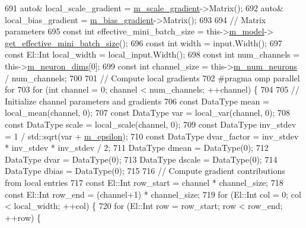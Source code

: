 \begin{DoxyCode}
691     \textcolor{keyword}{auto}& local\_scale\_gradient = \hyperlink{classlbann_1_1batch__normalization_a66364e1b0c9afb40a4c03ee1869d264c}{m\_scale\_gradient}->Matrix();
692     \textcolor{keyword}{auto}& local\_bias\_gradient = \hyperlink{classlbann_1_1batch__normalization_aa0f1e9a9f48f67544618e239167494bb}{m\_bias\_gradient}->Matrix();
693     
694     \textcolor{comment}{// Matrix parameters}
695     \textcolor{keyword}{const} \textcolor{keywordtype}{int} effective\_mini\_batch\_size = this->\hyperlink{classlbann_1_1Layer_a3d9315e99574166f2f33e37b572021d2}{m\_model}->
      \hyperlink{classlbann_1_1model_a2a9b4cfa1c8c91e4131908751f9c4a6a}{get\_effective\_mini\_batch\_size}();
696     \textcolor{keyword}{const} \textcolor{keywordtype}{int} width = input.Width();
697     \textcolor{keyword}{const} El::Int local\_width = local\_input.Width();
698     \textcolor{keyword}{const} \textcolor{keywordtype}{int} num\_channels = this->\hyperlink{classlbann_1_1Layer_abb34bb8031f57a483e2e327a5f229f48}{m\_neuron\_dims}[0];
699     \textcolor{keyword}{const} \textcolor{keywordtype}{int} channel\_size = this->\hyperlink{classlbann_1_1Layer_a6b5ebc8a7d9329d8a773ed787e7b41d8}{m\_num\_neurons} / num\_channels;
700 
701     \textcolor{comment}{// Compute local gradients}
702 \textcolor{preprocessor}{    #pragma omp parallel for}
703     \textcolor{keywordflow}{for} (\textcolor{keywordtype}{int} channel = 0; channel < num\_channels; ++channel) \{
704 
705       \textcolor{comment}{// Initialize channel parameters and gradients}
706       \textcolor{keyword}{const} DataType mean = local\_mean(channel, 0);
707       \textcolor{keyword}{const} DataType var = local\_var(channel, 0);
708       \textcolor{keyword}{const} DataType scale = local\_scale(channel, 0);
709       \textcolor{keyword}{const} DataType inv\_stdev = 1 / std::sqrt(var + \hyperlink{classlbann_1_1batch__normalization_ab82e74f905b7a117d9940f8542451e37}{m\_epsilon});
710       \textcolor{keyword}{const} DataType dvar\_factor = inv\_stdev * inv\_stdev * inv\_stdev / 2;
711       DataType dmean = DataType(0);
712       DataType dvar = DataType(0);
713       DataType dscale = DataType(0);
714       DataType dbias = DataType(0);
715 
716       \textcolor{comment}{// Compute gradient contributions from local entries}
717       \textcolor{keyword}{const} El::Int row\_start = channel * channel\_size;
718       \textcolor{keyword}{const} El::Int row\_end = (channel+1) * channel\_size;
719       \textcolor{keywordflow}{for} (El::Int col = 0; col < local\_width; ++col) \{
720         \textcolor{keywordflow}{for} (El::Int row = row\_start; row < row\_end; ++row) \{

\end{DoxyCode}
